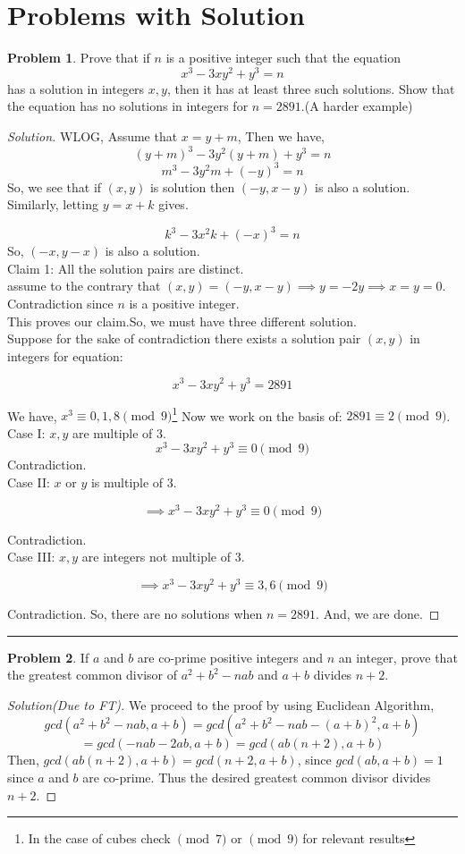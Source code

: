 \documentclass[a4paper,oneside,12 pt]{book}
\theoremstyle{definition}
\theoremstyle{definition}
\newtheorem{prbm}{Problem}[section]
\theoremstyle{definition}
\begin{document}
\section{Problems with Solution}
\begin{prbm}
 Prove that if $n$ is a positive integer such that the equation \[ x^3-3xy^2+y^3=n \] has a solution in integers $x,y$, then it has at least three such solutions. Show that the equation has no solutions in integers for $n=2891$.(A harder example)
\begin{proof} [Solution]
WLOG, Assume that $x=y+m$,
Then we have,
$$(y+m)^3-3y^2(y+m)+y^3=n$$$$m^3-3y^2m+(-y)^3=n$$
So, we see that if $(x,y)$ is solution then $(-y,x-y)$ is also a solution.\\
Similarly, letting $y=x+k$ gives.

$$k^3-3x^2k+(-x)^3=n$$
So, $(-x,y-x)$ is also a solution.\\
Claim 1: All the solution pairs are distinct.\\
assume to the contrary that $(x,y)=(-y,x-y)\implies y=-2y \implies x=y=0$.\\
Contradiction since $n$ is a positive integer.\\
This proves our claim.So, we must have three different solution.\\
Suppose for the sake of contradiction there exists a solution pair $(x,y)$ in integers for equation:

$$x^3-3xy^2+y^3=2891$$

We have, $x^3 \equiv 0,1,8 \pmod{9}$\footnote{ In the case of cubes check $\pmod{7} $ or $\pmod{9}$ for relevant results}
Now we work on the basis of: $2891 \equiv 2 \pmod{9}$.\\
Case I: $x,y$ are multiple of $3$.
$$x^3-3xy^2+y^3 \equiv 0 \pmod{9}$$
Contradiction.\\
Case II: $x$ or $y$ is multiple of $3$.

$$\implies x^3-3xy^2+y^3 \equiv 0 \pmod{9}$$

Contradiction.\\
Case III: $x,y$ are integers not multiple of 3.
 
$$\implies x^3-3xy^2+y^3 \equiv 3,6 \pmod {9}$$

Contradiction.
So, there are no solutions when $n=2891$. And, we are done.
\end{proof}
\end{prbm}
\rule{\textwidth}{1pt}
\begin{prbm}
If $a$ and $b$ are co-prime positive integers and $n$ an integer, prove that the greatest common divisor of $a^2+b^2-nab$ and $a+b$ divides $n+2$.
 \begin{proof}[Solution(Due to FT)]
 We proceed to the proof by using Euclidean Algorithm,
 $$gcd(a^2+b^2-nab,a+b)=gcd(a^2+b^2-nab-(a+b)^2,a+b)$$
 $$=gcd(-nab-2ab,a+b)=gcd(ab(n+2),a+b)$$
Then,
$gcd(ab(n+2),a+b)=gcd(n+2,a+b)$, since $gcd(ab,a+b)=1$ since $a$ and $b$ are co-prime.
Thus the desired greatest common divisor divides $n+2$.
\end{proof}
\end{prbm}
\end{document}
